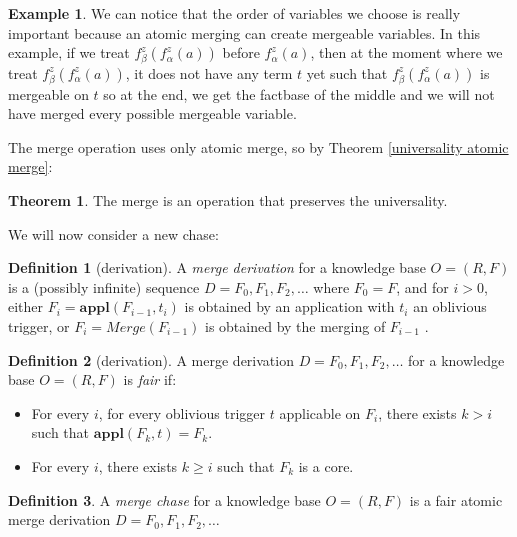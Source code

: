 \documentclass{article}
\theoremstyle{definition}
\newtheorem{definition}{Definition}[section]
\newtheorem{theorem}{Theorem}[section]
\newtheorem{example}{Example}[section]
\theoremstyle{remark}
\newcommand{\Merge}{\textit{Merge}}
\newcommand{\Appl}{\textbf{appl}}
\begin{document}
\begin{example}
We can notice that the order of variables we choose is really important because an atomic merging can create mergeable variables. In this example, if we treat $f_\beta^z(f_\alpha^z(a))$ before $f_\alpha^z(a)$, then at the moment where we treat $f_\beta^z(f_\alpha^z(a))$, it does not have any term $t$ yet such that $f_\beta^z(f_\alpha^z(a))$ is mergeable on $t$ so at the end, we get the factbase of the middle and we will not have merged every possible mergeable variable.
\end{example}

The merge operation uses only atomic merge, so by Theorem \ref{universality atomic merge}:

\begin{theorem} \label{universality merge}
The merge is an operation that preserves the universality.
\end{theorem}

We will now consider a new chase:

\begin{definition}[derivation]
A \emph{merge derivation} for a knowledge base $O = (R,F)$ is a (possibly infinite) sequence $D = F_0, F_1, F_2, \ldots$ where $F_0 = F$, and for $i >0$, either $F_{i}= \Appl(F_{i-1},t_i)$ is obtained by an application with $t_i$ an oblivious trigger, or $F_i = \Merge(F_{i-1})$ is obtained by the merging of $F_{i-1}$ . 
\end{definition} 

\begin{definition}[derivation]
A merge derivation $D = F_0, F_1, F_2, \ldots$ for a knowledge base $O = (R,F)$ is \emph{fair} if: 
\begin{itemize}
\item For every $i$, for every oblivious trigger $t$ applicable on $F_i$, there exists $k > i$ such that $\Appl(F_{k},t) = F_k$.
\item For every $i$, there exists $k \geq i$ such that $F_k$ is a core.
\end{itemize}
\end{definition} 

\begin{definition}
A \emph{merge chase} for a knowledge base $O= (R,F)$ is a fair atomic merge derivation $D=F_0,F_1,F_2,\ldots$
\end{definition}
\end{document}
